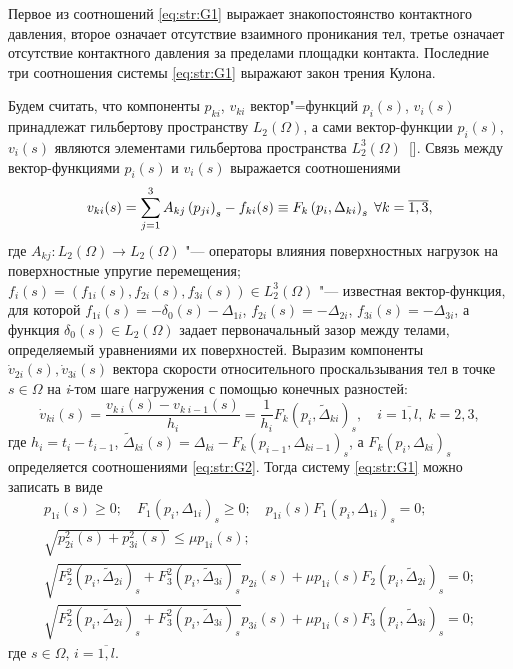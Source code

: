 Первое из соотношений \eqref{eq:str:G1} выражает знакопостоянство контактного давления, второе означает отсутствие взаимного проникания тел, третье означает отсутствие контактного давления за пределами площадки контакта.
Последние три соотношения системы \eqref{eq:str:G1} выражают закон трения Кулона.

Будем считать, что компоненты $p_{ki} $, $v_{ki} $ вектор"=функций $p_{i} (s)$, $v_{i} (s)$ принадлежат гильбертову пространству $L_{2} (\Omega)$, а сами вектор-функции $p_{i} (s)$, $v_{i} (s)$ являются элементами гильбертова пространства  $L_{2}^{3} (\Omega)$~[].
Связь между вектор-функциями $p_{i} (s)$ и $v_{i} (s)$ выражается соотношениями  
\begin{equation} 
\label{eq:str:G2} 
v_{ki} (s)=\sum _{j=1}^{3}A_{kj} \left(p_{ji} \right)_{s} -f_{ki} (s) \equiv F_{k} \left(p_{i} ,\Delta _{ki} \right)_{s} {\rm \; } \forall k=\overline{1, 3}, 
\end{equation}
где $A_{kj}\colon L_{2} (\Omega)\to L_{2} (\Omega)$ "--- операторы влияния поверхностных нагрузок на поверхностные упругие перемещения; 
$f_{i} (s)=\left(f_{1i} (s),f_{2i} (s),f_{3i} (s)\right)\in L_{2}^{3} (\Omega)$ "--- известная вектор-функция, для которой $f_{1i} (s)=-\delta _{0} (s)-\Delta _{1i} $, $f_{2i} (s)=-\Delta _{2i} $, $f_{3i} (s)=-\Delta _{3i} $, а функция $\delta _{0} (s)\in L_{2} (\Omega)$ задает первоначальный зазор между телами, определяемый уравнениями их поверхностей.
Выразим компоненты $\dot{v}_{2i} (s),\dot{v}_{3i} (s)$  вектора скорости относительного проскальзывания тел в точке $s\in \Omega $ на \textit{i}-том шаге нагружения с помощью конечных разностей:
\begin{equation} 
\label{eq:str:G3}
\dot{v}_{ki} (s)=\frac{v_{k \; i} (s)-v_{k \; i-1} (s)}{h_{i} } =\frac{1}{h_{i} }  F_{k} (p_{i} ,\tilde{\Delta }_{ki} )_{s} ,\quad  i=\overline{1,l},\; k=2, 3, 
\end{equation}
где $h_{i} =t_{i} -t_{i-1} $, $\tilde{\Delta }_{ki} (s)=\Delta _{ki} -F_{k} \left(p_{i-1} ,\Delta _{k i-1} \right)_{s} $, а $F_{k} \left(p_{i} ,\Delta _{ki} \right)_{s} $ определяется соотношениями \eqref{eq:str:G2}.
Тогда систему \eqref{eq:str:G1} можно записать в виде
\begin{equation} \label{eq:str:G4} 
\begin{array}{l} 
p_{1i} (s)\ge 0;\quad  F_{1} \left(p_{i} ,\Delta _{1i} \right)_{s} \ge 0; \quad  p_{1i} (s) F_{1} \left(p_{i} ,\Delta _{1i} \right)_{s} =0; 
\\ 
\sqrt{p_{2i}^{2} (s)+p_{3i}^{2} (s)} \le \mu  p_{1i} (s); 
\\ 
\sqrt{F_{2}^{2} (p_{i} ,\tilde{\Delta }_{2i} )_{s} +F_{3}^{2} (p_{i} ,\tilde{\Delta }_{3i} )_{s} }  p_{2i} (s)+\mu p_{1i} (s) F_{2}  (p_{i} ,\tilde{\Delta }_{2i} )_{s} =0; 
\\ 
\sqrt{F_{2}^{2} (p_{i} ,\tilde{\Delta }_{2i} )_{s} +F_{3}^{2} (p_{i} ,\tilde{\Delta }_{3i} )_{s} }  p_{3i} (s)+\mu  p_{1i} (s) F_{3}  (p_{i} ,\tilde{\Delta }_{3i} )_{s} =0; \end{array}
 \end{equation} 
где $s\in \Omega$, $i=\overline{1, l}$.


